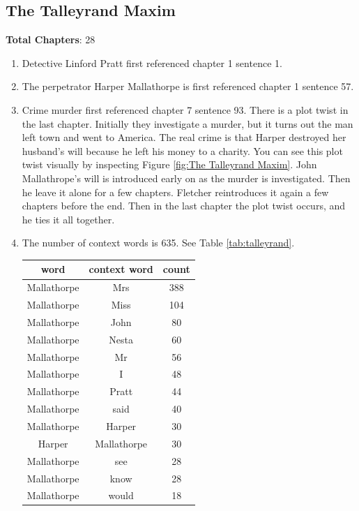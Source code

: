 \documentclass{article}
\begin{document}
\subsection{The Talleyrand Maxim}
\textbf{Total Chapters}: 28 \\
\begin{enumerate}
    \item Detective Linford Pratt first referenced chapter 1 sentence 1. \\
    \item The perpetrator Harper Mallathorpe is first referenced chapter 1 sentence 57. \\
    \item Crime murder first referenced chapter 7 sentence 93. There is a plot twist in the last chapter. Initially they investigate a murder, but it turns out the man left town and went to America. The real crime is that Harper destroyed her husband's will because he left his money to a charity. You can see this plot twist visually by inspecting Figure \ref{fig:The Talleyrand Maxim}. John Mallathrope's will is introduced early on as the murder is investigated. Then he leave it alone for a few chapters. Fletcher reintroduces it again a few chapters before the end. Then in the last chapter the plot twist occurs, and he ties it all together.\\
    \item The number of context words is 635. See Table \ref{tab:talleyrand}.
        \begin{table}[]
        \centering
        \begin{tabular}{c|c|c}
        word & context word & count \\ \hline
Mallathorpe & Mrs & 388 \\
Mallathorpe & Miss & 104 \\
Mallathorpe & John & 80 \\
Mallathorpe & Nesta & 60 \\
Mallathorpe & Mr & 56 \\
Mallathorpe & I & 48 \\
Mallathorpe & Pratt & 44 \\
Mallathorpe & said & 40 \\
Mallathorpe & Harper & 30 \\
Harper & Mallathorpe & 30 \\
Mallathorpe & see & 28 \\
Mallathorpe & know & 28 \\
Mallathorpe & would & 18 \\

\end{tabular}
\end{table}
\end{enumerate}
\end{document}

